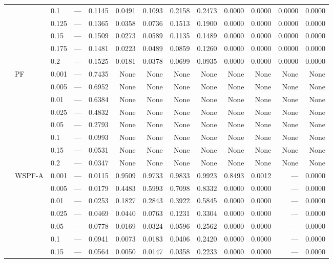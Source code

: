 {\begin{longtable}{@{}lllrrrrrrrrrr@{}}
 &  & 0.1 & --- & 0.1145 & 0.0491 & 0.1093 & 0.2158 & 0.2473 & 0.0000 & 0.0000 & 0.0000 & 0.0000 \\
 &  & 0.125 & --- & 0.1365 & 0.0358 & 0.0736 & 0.1513 & 0.1900 & 0.0000 & 0.0000 & 0.0000 & 0.0000 \\
 &  & 0.15 & --- & 0.1509 & 0.0273 & 0.0589 & 0.1135 & 0.1489 & 0.0000 & 0.0000 & 0.0000 & 0.0000 \\
 &  & 0.175 & --- & 0.1481 & 0.0223 & 0.0489 & 0.0859 & 0.1260 & 0.0000 & 0.0000 & 0.0000 & 0.0000 \\
 &  & 0.2 & --- & 0.1525 & 0.0181 & 0.0378 & 0.0699 & 0.0935 & 0.0000 & 0.0000 & 0.0000 & 0.0000 \\
\midrule
 & PF & 0.001 & --- & 0.7435 & None & None & None & None & None & None & None & None \\
 &  & 0.005 & --- & 0.6952 & None & None & None & None & None & None & None & None \\
 &  & 0.01 & --- & 0.6384 & None & None & None & None & None & None & None & None \\
 &  & 0.025 & --- & 0.4832 & None & None & None & None & None & None & None & None \\
 &  & 0.05 & --- & 0.2793 & None & None & None & None & None & None & None & None \\
 &  & 0.1 & --- & 0.0993 & None & None & None & None & None & None & None & None \\
 &  & 0.15 & --- & 0.0531 & None & None & None & None & None & None & None & None \\
 &  & 0.2 & --- & 0.0347 & None & None & None & None & None & None & None & None \\
 & WSPF-A & 0.001 & --- & 0.0115 & 0.9509 & 0.9733 & 0.9833 & 0.9923 & 0.8493 & 0.0012 & --- & 0.0000 \\
 &  & 0.005 & --- & 0.0179 & 0.4483 & 0.5993 & 0.7098 & 0.8332 & 0.0000 & 0.0000 & --- & 0.0000 \\
 &  & 0.01 & --- & 0.0253 & 0.1827 & 0.2843 & 0.3922 & 0.5845 & 0.0000 & 0.0000 & --- & 0.0000 \\
 &  & 0.025 & --- & 0.0469 & 0.0440 & 0.0763 & 0.1231 & 0.3304 & 0.0000 & 0.0000 & --- & 0.0000 \\
 &  & 0.05 & --- & 0.0778 & 0.0169 & 0.0324 & 0.0596 & 0.2562 & 0.0000 & 0.0000 & --- & 0.0000 \\
 &  & 0.1 & --- & 0.0941 & 0.0073 & 0.0183 & 0.0406 & 0.2420 & 0.0000 & 0.0000 & --- & 0.0000 \\
 &  & 0.15 & --- & 0.0564 & 0.0050 & 0.0147 & 0.0358 & 0.2233 & 0.0000 & 0.0000 & --- & 0.0000 \\

\end{longtable}}
